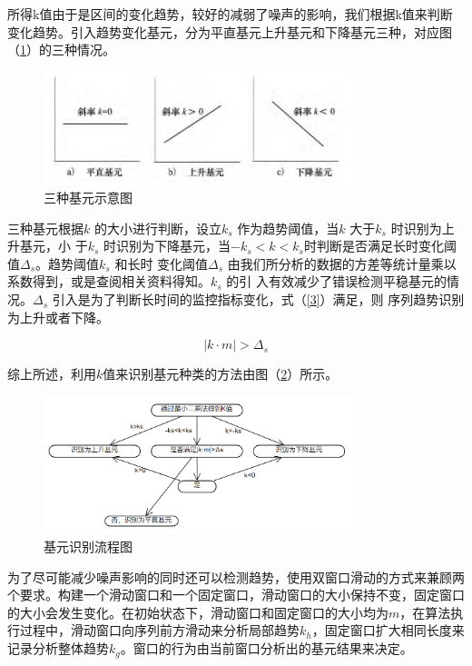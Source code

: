 \documentclass{my_paper}
\begin{document}
所得k值由于是区间的变化趋势，较好的减弱了噪声的影响，我们根据k值来判断变化趋势。引入趋势变化基元，分为平直基元上升基元和下降基元三种，对应图（\ref{jiyuan}）的三种情况。

\begin {figure}[h]
\centering %
\includegraphics[width=0.8\textwidth]{jiyuan.png}
\caption{三种基元示意图} %
\label{jiyuan}
\end {figure}

三种基元根据$k$ 的大小进行判断，设立$k_s$ 作为趋势阈值，当$k$ 大于$k_s$ 时识别为上升基元，小
于$k_s$ 时识别为下降基元，当$-k_s < k < k_s $时判断是否满足长时变化阈值$\Delta_s$。趋势阈值$k_s$ 和长时
变化阈值$\Delta_s$ 由我们所分析的数据的方差等统计量乘以系数得到，或是查阅相关资料得知。$k_s$ 的引
入有效减少了错误检测平稳基元的情况。$\Delta_s$ 引入是为了判断长时间的监控指标变化，式（\ref{3}）满足，则
序列趋势识别为上升或者下降。

\begin{equation}
    |k\cdot m|>\Delta_s
    \label{3}
    \end{equation}

    综上所述，利用$k$值来识别基元种类的方法由图（\ref{jyz}）所示。

    \begin {figure}[h]
    \centering %
    \includegraphics[width=0.8\textwidth]{jiyuanz.png}
    \caption{基元识别流程图} %
    \label{jyz}
    \end {figure}

为了尽可能减少噪声影响的同时还可以检测趋势，使用双窗口滑动\cite{2}的方式来兼顾两个要求。构建一个滑动窗口和一个固定窗口，滑动窗口的大小保持不变，固定窗口的大小会发生变化。在初始状态下，滑动窗口和固定窗口的大小均为$m$，在算法执行过程中，滑动窗口向序列前方滑动来分析局部趋势$k_h$，固定窗口扩大相同长度来记录分析整体趋势$k_g$。窗口的行为由当前窗口分析出的基元结果来决定。
\end{document}
